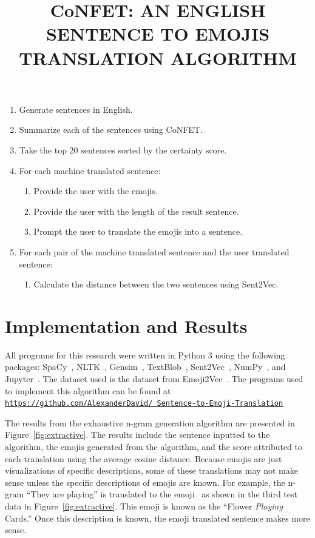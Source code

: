 \documentclass{article}[10]
\newcommand*{\img}[1]{%
  \raisebox{-.3\baselineskip}{%
    \texttt{[image: \#1]}%
  }%
} \title{{CoNFET:} AN ENGLISH SENTENCE TO EMOJIS TRANSLATION ALGORITHM}
\begin{document}
\begin{enumerate}[label= (\arabic*)]
  \itemsep0em
  \item Generate sentences in English.
  \item Summarize each of the sentences using CoNFET\@.
  \item Take the top 20 sentences sorted by the certainty score.
  \item For each machine translated sentence:
    \begin{enumerate}[topsep=0pt]
      \itemsep0em
      \item Provide the user with the emojis.
      \item Provide the user with the length of the result sentence.
      \item Prompt the user to translate the emojis into a sentence.
    \end{enumerate}
  \item For each pair of the machine translated sentence and the user translated
    sentence:
    \begin{enumerate}[topsep=0pt]
      \itemsep0em
      \item Calculate the distance between the two sentences using Sent2Vec.
    \end{enumerate}
\end{enumerate}

\section{Implementation and Results\label{sec:implementationAndResults}}

All programs for this research were written in Python 3 using the following
packages: SpaCy~\cite{spacy2}, NLTK~\cite{bird2009natural},
Gensim~\cite{gensim}, TextBlob~\cite{TextBlob}, Sent2Vec~\cite{pg2017unsu},
NumPy~\cite{numpy}, and Jupyter~\cite{Kluyver:2016aa}. The dataset used is the
dataset from Emoji2Vec~\cite{Eisner_2016}. The programs used to implement this
algorithm can be found at
\texttt{\href{https://github.com/AlexanderDavid/Sentence-to-Emoji-Translation}{https://github.com/AlexanderDavid/
    Sentence-to-Emoji-Translation}}

The results from the exhaustive n-gram generation algorithm are presented in
Figure~\ref{fig:extractive}. The results include the sentence inputted to the
algorithm, the emojis generated from the algorithm, and the score attributed to
each translation using the average cosine distance. Because emojis are just visualizations of specific descriptions, some of these translations
may not make sense unless the specific descriptions of emojis are known. For
example, the n-gram ``They are playing'' is translated to the
emoji~\img{emojis/1f3b4.png} as shown in the third test data in
Figure~\ref{fig:extractive}. This emoji is known as the ``Flower \emph{Playing}
Cards.'' Once this description is known, the emoji translated sentence makes
more sense.
\end{document}
